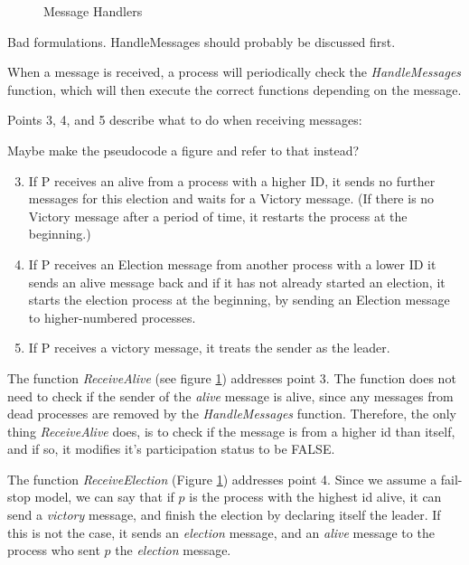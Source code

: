 \documentclass{report}
\begin{document}
\begin{calloutgreen}
\begin{calloutyellow}
\begin{figure}
\fl{}\bottombar\cl{}

\caption{Message Handlers}
\label{messagehandlers}
\end{figure}

\begin{calloutyellow}
Bad formulations. HandleMessages should probably be discussed first.
  \end{calloutyellow}

When a message is received, a process will periodically check the \textit{HandleMessages} function, which will then execute the correct functions depending on the message.

Points 3, 4, and 5 describe what to do when receiving messages:

\begin{calloutyellow}
Maybe make the pseudocode a figure and refer to that instead?
\end{calloutyellow}
\begin{enumerate}
  \setcounter{enumi}{2}
  \item If P receives an alive from a process with a higher ID, it sends no further messages for this election and waits for a Victory message. (If there is no Victory message after a period of time, it restarts the process at the beginning.)
  \item If P receives an Election message from another process with a lower ID it sends an alive message back and if it has not already started an election, it starts the election process at the beginning, by sending an Election message to higher-numbered processes.
  \item If P receives a victory message, it treats the sender as the leader.
\end{enumerate}

The function \textit{ReceiveAlive} (see figure \ref{messagehandlers}) addresses point 3. The function does not need to check if the sender of the \textit{alive} message is alive, since any messages from dead processes are removed by the \textit{HandleMessages} function. Therefore, the only thing \textit{ReceiveAlive} does, is to check if the message is from a higher id than itself, and if so, it modifies it's participation status to be FALSE.

The function \textit{ReceiveElection} (Figure \ref{messagehandlers}) addresses point 4. Since we assume a fail-stop model, we can say that if $p$ is the process with the highest id alive, it can send a \textit{victory} message, and finish the election by declaring itself the leader. If this is not the case, it sends an \textit{election} message, and an \textit{alive} message to the process who sent $p$ the \textit{election} message.


\end{calloutyellow}
\end{calloutgreen}
\end{document}
